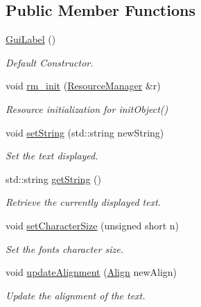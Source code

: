 \subsection*{Public Member Functions}
\begin{DoxyCompactItemize}
\item 
\mbox{\label{class_gui_label_aa996ad603e5692673485780ee6b6bf27}} 
\mbox{\hyperlink{class_gui_label_aa996ad603e5692673485780ee6b6bf27}{Gui\+Label}} ()
\begin{DoxyCompactList}\small\item\em Default Constructor. \end{DoxyCompactList}\item 
void \mbox{\hyperlink{class_gui_label_afa1cce21b5bfaba22076619ec635de84}{rm\+\_\+init}} (\mbox{\hyperlink{class_resource_manager}{Resource\+Manager}} \&r)
\begin{DoxyCompactList}\small\item\em Resource initialization for init\+Object() \end{DoxyCompactList}\item 
void \mbox{\hyperlink{class_gui_label_a40dcdb9bc406ab8ecee7e1e6df69c989}{set\+String}} (std\+::string new\+String)
\begin{DoxyCompactList}\small\item\em Set the text displayed. \end{DoxyCompactList}\item 
std\+::string \mbox{\hyperlink{class_gui_label_ade16f5556300d8c353f7c45684bd75eb}{get\+String}} ()
\begin{DoxyCompactList}\small\item\em Retrieve the currently displayed text. \end{DoxyCompactList}\item 
void \mbox{\hyperlink{class_gui_label_ab0eaf82245f1271dd8e261fd306647b1}{set\+Character\+Size}} (unsigned short n)
\begin{DoxyCompactList}\small\item\em Set the font\textquotesingle{}s character size. \end{DoxyCompactList}\item 
void \mbox{\hyperlink{class_gui_label_ae9ba2f0ceb51fbe073ba8fc297288aff}{update\+Alignment}} (\mbox{\hyperlink{class_gui_label_a408cd142a14adb06d632ed44e674ddf2}{Align}} new\+Align)
\begin{DoxyCompactList}\small\item\em Update the alignment of the text. \end{DoxyCompactList}\end{DoxyCompactItemize}
